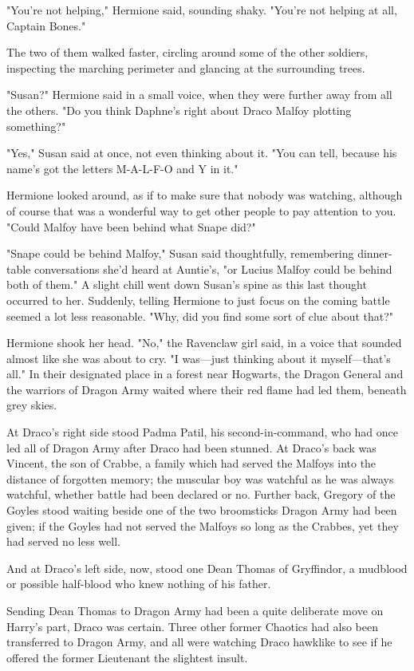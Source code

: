 "You're not helping," Hermione said, sounding shaky. "You're not helping at
all, Captain Bones."

The two of them walked faster, circling around some of the other soldiers,
inspecting the marching perimeter and glancing at the surrounding trees.

"Susan?" Hermione said in a small voice, when they were further away from
all the others. "Do you think Daphne's right about Draco Malfoy plotting
something?"

"Yes," Susan said at once, not even thinking about it. "You can tell, because
his name's got the letters M-A-L-F-O and Y in it."

Hermione looked around, as if to make sure that nobody was watching, although
of course that was a wonderful way to get other people to pay attention to you.
"Could Malfoy have been behind what Snape did?"

"Snape could be behind Malfoy," Susan said thoughtfully, remembering
dinner-table conversations she'd heard at Auntie's, "or Lucius Malfoy could be
behind both of them." A slight chill went down Susan's spine as this last
thought occurred to her. Suddenly, telling Hermione to just focus on the coming
battle seemed a lot less reasonable. "Why, did you find some sort of clue about
that?"

Hermione shook her head. "No," the Ravenclaw girl said, in a voice that sounded
almost like she was about to cry. "I was---just thinking about it
myself---that's all."
\later
In their designated place in a forest near Hogwarts, the Dragon General and the
warriors of Dragon Army waited where their red flame had led them, beneath grey
skies.

At Draco's right side stood Padma Patil, his second-in-command, who had once
led all of Dragon Army after Draco had been stunned. At Draco's back was
Vincent, the son of Crabbe, a family which had served the Malfoys into the
distance of forgotten memory; the muscular boy was watchful as he was always
watchful, whether battle had been declared or no. Further back, Gregory of the
Goyles stood waiting beside one of the two broomsticks Dragon Army had been
given; if the Goyles had not served the Malfoys so long as the Crabbes, yet
they had served no less well.

And at Draco's left side, now, stood one Dean Thomas of Gryffindor, a mudblood
or possible half-blood who knew nothing of his father.

Sending Dean Thomas to Dragon Army had been a quite deliberate move on Harry's
part, Draco was certain. Three other former Chaotics had also been transferred
to Dragon Army, and all were watching Draco hawklike to see if he offered the
former Lieutenant the slightest insult.

